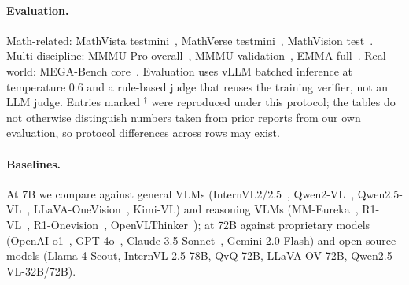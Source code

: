 \documentclass{article}
\begin{document}
\paragraph{Evaluation.} Math-related: MathVista testmini~\citep{mathvista}, MathVerse testmini~\citep{mathverse}, MathVision test~\citep{mathvision}. Multi-discipline: MMMU-Pro overall~\citep{mmmupro}, MMMU validation~\citep{yue2024mmmu}, EMMA full~\citep{emma}. Real-world: MEGA-Bench core~\citep{chen2024mega}. Evaluation uses vLLM batched inference at temperature 0.6 and a rule-based judge that reuses the training verifier, not an LLM judge. Entries marked $^\dagger$ were reproduced under this protocol; the tables do not otherwise distinguish numbers taken from prior reports from our own evaluation, so protocol differences across rows may exist.

\paragraph{Baselines.} At 7B we compare against general VLMs (InternVL2/2.5~\citep{internvl_2_5}, Qwen2-VL~\citep{qwen2vl}, Qwen2.5-VL~\citep{qwen2_5_vl}, LLaVA-OneVision~\citep{llavaov}, Kimi-VL) and reasoning VLMs (MM-Eureka~\citep{mmeureka}, R1-VL~\citep{r1vl}, R1-Onevision~\citep{R1OneVision}, OpenVLThinker~\citep{OpenVLThinker}); at 72B against proprietary models (OpenAI-o1~\citep{openai-o1}, GPT-4o~\citep{gpt4o}, Claude-3.5-Sonnet~\citep{claude35}, Gemini-2.0-Flash) and open-source models (Llama-4-Scout, InternVL-2.5-78B, QvQ-72B, LLaVA-OV-72B, Qwen2.5-VL-32B/72B).
\end{document}
